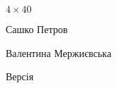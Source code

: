 
\def\Title{$4\times40$}
\def\SashkoName{Сашко Петров}
\def\SashkoEmail{alexandervpetrov@gmail.com}
\def\ValyaName{Валентина Мержиєвська}
\def\ValyaEmail{yakavoska@gmail.com}



\cleartooddpage
\hbox{}\vfill
\begin{center}
  \vspace*{\OPTtitleskip}
  {\fontsize{\OPTtitletitlefont}{\OPTtitletitlefont}\selectfont%
  \Title}\par
  \vspace*{\OPTtitleskip}
  {\fontsize{\OPTauthorfont}{\OPTauthorfont}\selectfont%
  \SashkoName\par
  \vspace*{\OPTauthorinsideskip}
  \ValyaName\par
  }
  \vspace*{\OPTauthorskip}
  {\fontsize{\OPTversionfont}{\OPTversionfont}\selectfont%
  Версія \Version\par
  \vspace*{\OPTversioninsideskip}
  \Date\par
  }
\end{center}
\vfill\hbox{}
\clearpage

\restoregeometry
